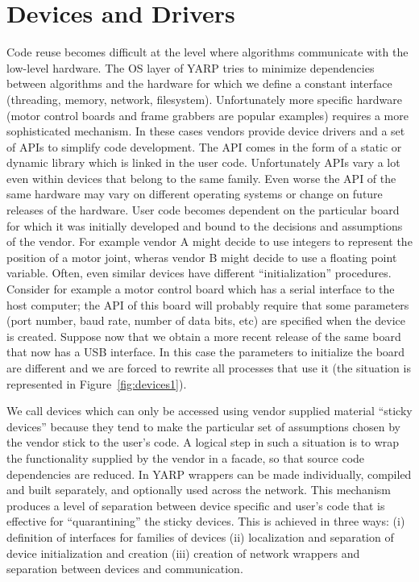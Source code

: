 \section{Devices and Drivers}
Code reuse becomes difficult at the level where algorithms 
communicate with the low-level hardware. The OS layer of YARP tries 
to minimize dependencies between algorithms and the hardware for 
which we define a constant interface (threading, 
memory, network, filesystem). Unfortunately more specific hardware 
(motor control boards and frame grabbers are popular 
examples) requires a more sophisticated mechanism. In these 
cases vendors provide device drivers and a set of APIs to simplify 
code development. The API comes in the form of a static or dynamic 
library which is linked in the user code. Unfortunately
APIs vary a lot even within devices that belong to the same family. 
Even worse the API of the same hardware may vary on different 
operating systems or change on future releases of the hardware. User 
code becomes dependent on the particular board for which it was initially 
developed and bound to the decisions and assumptions of the vendor. For 
example vendor A might decide to use integers to represent the position 
of a motor joint, wheras vendor B might decide to use a floating point
variable. Often, even similar devices have different ``initialization'' 
procedures. Consider for example a motor control board which has a serial
interface to the host computer; the API of this board will probably require 
that some parameters (port number, baud rate, number of data bits, etc) are 
specified when the device is created. Suppose now that we obtain a more 
recent release of the same board that now has a USB interface. In this 
case the parameters to initialize the board are different and we are forced 
to rewrite all processes that use it (the situation is 
represented in Figure~\ref{fig:devices1}). 

We call devices which can only be accessed using vendor 
supplied material ``sticky devices'' 
because they tend to make the particular set of assumptions chosen by 
the vendor stick to the user's code. A logical step in such a situation 
is to wrap the functionality supplied by the vendor in a facade, so that 
source code dependencies are reduced. In YARP wrappers can be 
made individually, compiled and built separately, and optionally used 
across the network. This mechanism produces a level of separation between 
device specific and user's code that is effective for ``quarantining'' the 
sticky devices. This is achieved in three ways: (i) definition of interfaces 
for families of devices (ii) localization and separation of device 
initialization and creation (iii) creation of network wrappers and separation 
between devices and communication. 

